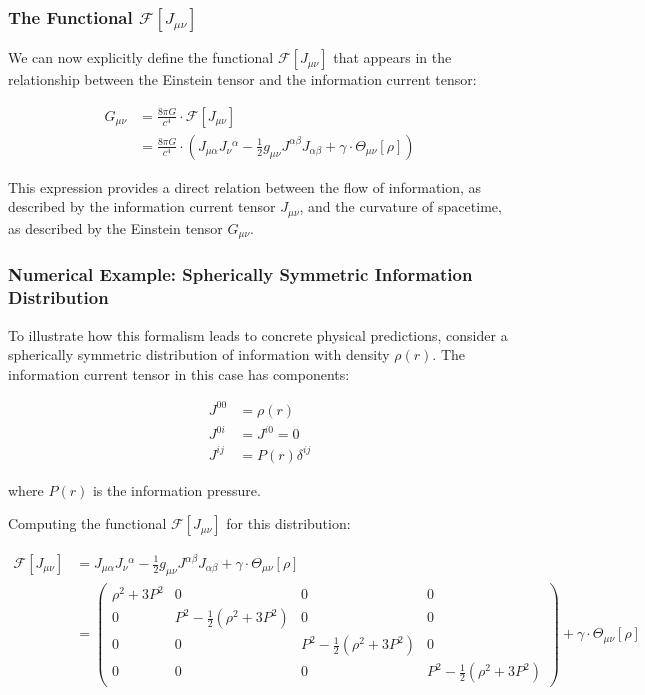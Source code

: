 \documentclass[11pt,english,twoside]{article}
\begin{document}
\subsubsection{The Functional $\mathcal{F}[J_{\mu\nu}]$}

We can now explicitly define the functional $\mathcal{F}[J_{\mu\nu}]$ that appears in the relationship between the Einstein tensor and the information current tensor:

\begin{align}
G_{\mu\nu} &= \frac{8\pi G}{c^4} \cdot \mathcal{F}[J_{\mu\nu}]\\
&= \frac{8\pi G}{c^4} \cdot \left(J_{\mu\alpha}J_{\nu}{}^{\alpha} - \frac{1}{2}g_{\mu\nu}J^{\alpha\beta}J_{\alpha\beta} + \gamma \cdot \Theta_{\mu\nu}[\rho]\right)
\end{align}

This expression provides a direct relation between the flow of information, as described by the information current tensor $J_{\mu\nu}$, and the curvature of spacetime, as described by the Einstein tensor $G_{\mu\nu}$.

\subsubsection{Numerical Example: Spherically Symmetric Information Distribution}

To illustrate how this formalism leads to concrete physical predictions, consider a spherically symmetric distribution of information with density $\rho(r)$. The information current tensor in this case has components:

\begin{align}
J^{00} &= \rho(r)\\
J^{0i} &= J^{i0} = 0\\
J^{ij} &= P(r)\delta^{ij}
\end{align}

where $P(r)$ is the information pressure.

Computing the functional $\mathcal{F}[J_{\mu\nu}]$ for this distribution:

\begin{align}
\mathcal{F}[J_{\mu\nu}] &= J_{\mu\alpha}J_{\nu}{}^{\alpha} - \frac{1}{2}g_{\mu\nu}J^{\alpha\beta}J_{\alpha\beta} + \gamma \cdot \Theta_{\mu\nu}[\rho]\\
&= \begin{pmatrix}
\rho^2 + 3P^2 & 0 & 0 & 0 \\
0 & P^2 - \frac{1}{2}(\rho^2+3P^2) & 0 & 0 \\
0 & 0 & P^2 - \frac{1}{2}(\rho^2+3P^2) & 0 \\
0 & 0 & 0 & P^2 - \frac{1}{2}(\rho^2+3P^2)
\end{pmatrix} + \gamma \cdot \Theta_{\mu\nu}[\rho]
\end{align}
\end{document}
